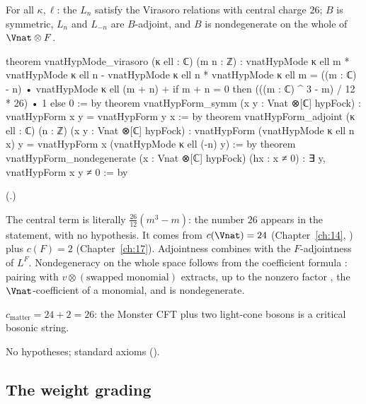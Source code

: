 \begin{theorem}\label{ch18:thm:sectorlaws}
For all $\kappa,\ell$: the $L_n$ satisfy the Virasoro relations with central charge $26$; $B$ is symmetric,
$L_n$ and $L_{-n}$ are $B$-adjoint, and $B$ is nondegenerate on the whole of $\Vnat\otimes F$.
\end{theorem}
\begin{leancode}
theorem vnatHypMode_virasoro (κ ell : ℂ) (m n : ℤ) :
    vnatHypMode κ ell m * vnatHypMode κ ell n -
      vnatHypMode κ ell n * vnatHypMode κ ell m =
      ((m : ℂ) - n) • vnatHypMode κ ell (m + n) +
        if m + n = 0 then (((m : ℂ) ^ 3 - m) / 12 * 26) • 1 else 0 := by
theorem vnatHypForm_symm (x y : Vnat ⊗[ℂ] hypFock) : vnatHypForm x y = vnatHypForm y x := by
theorem vnatHypForm_adjoint (κ ell : ℂ) (n : ℤ) (x y : Vnat ⊗[ℂ] hypFock) :
    vnatHypForm (vnatHypMode κ ell n x) y = vnatHypForm x (vnatHypMode κ ell (-n) y) := by
theorem vnatHypForm_nondegenerate (x : Vnat ⊗[ℂ] hypFock) (hx : x ≠ 0) :
    ∃ y, vnatHypForm x y ≠ 0 := by
\end{leancode}
(.)
\begin{dictionary}
The central term  is literally $\frac{26}{12}(m^3-m)$: the
number $26$ appears in the statement, with no hypothesis.  It comes from $c(\Vnat)=24$ (Chapter~\ref{ch:14},
) plus $c(F)=2$ (Chapter~\ref{ch:17}).  Adjointness combines
 with the $F$-adjointness of $L^F$.  Nondegeneracy on the whole space
follows from the coefficient formula : pairing with $v\otimes(\text{swapped
monomial})$ extracts, up to the nonzero factor , the $\Vnat$-coefficient of a
monomial, and  is nondegenerate.
\end{dictionary}
\begin{physics}
$c_{\text{matter}}=24+2=26$: the Monster CFT plus two light-cone bosons is a critical bosonic string.
\end{physics}
\begin{status}No hypotheses; standard axioms ().\end{status}

\subsection{The weight grading}

